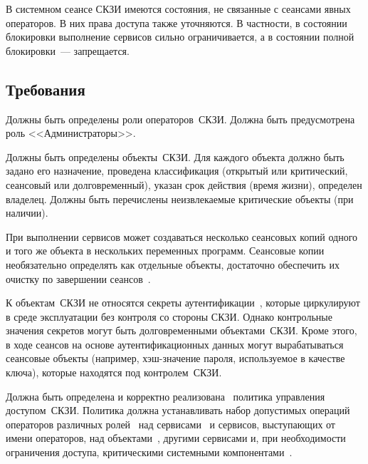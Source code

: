 В системном сеансе СКЗИ имеются состояния, не связанные с сеансами явных 
операторов. В них права доступа также уточняются. 
%
В частности, в состоянии блокировки выполнение сервисов 
сильно ограничивается, а в состоянии полной блокировки~--- запрещается. 

\subsection{Требования}\label{AC.Reqs}

\label{R.AC.Roles} %
Должны быть определены роли операторов~СКЗИ. 
Должна быть предусмотрена роль <<Администраторы>>.

\label{R.AC.Objects} %
Должны быть определены объекты~СКЗИ.
Для каждого объекта должно быть задано его назначение,
проведена классификация (открытый или критический, сеансовый или 
долговременный), указан срок действия (время жизни), определен владелец.
Должны быть перечислены неизвлекаемые критические объекты (при наличии).

\begin{note}
При выполнении сервисов может создаваться несколько сеансовых копий одного 
и того же объекта в нескольких переменных программ.
%
Сеансовые копии необязательно определять как отдельные объекты,
достаточно обеспечить их очистку по завершении сеансов~.
\end{note}

\begin{note}
К объектам~СКЗИ не относятся секреты аутентификации~,
которые циркулируют в среде эксплуатации без контроля со стороны СКЗИ.
%
Однако контрольные значения секретов могут быть долговременными объектами~СКЗИ.
Кроме этого, в ходе сеансов на основе аутентификационных данных могут
вырабатываться сеансовые объекты (например, хэш-значение пароля, используемое в
качестве ключа), которые находятся под контролем~СКЗИ.
\end{note}

\label{R.AC.Policy} %
Должна быть определена и корректно реализована~ 
политика управления доступом~СКЗИ.
Политика должна устанавливать набор допустимых 
операций операторов различных ролей~ 
над сервисами~ и сервисов, 
выступающих от имени операторов, над объектами~,
другими сервисами и, при необходимости ограничения доступа, 
критическими системными компонентами~.

